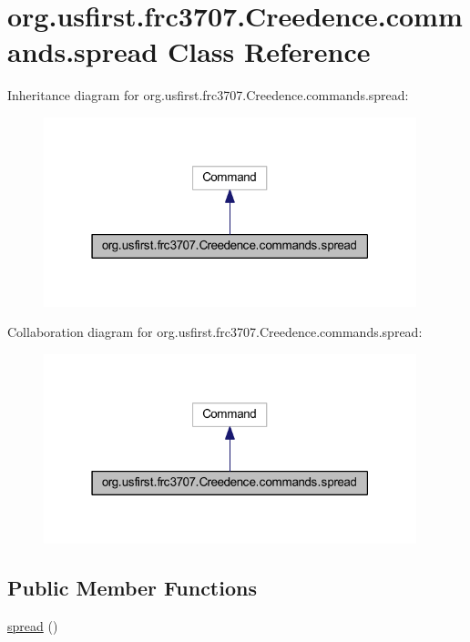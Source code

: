 \hypertarget{classorg_1_1usfirst_1_1frc3707_1_1_creedence_1_1commands_1_1spread}{}\section{org.\+usfirst.\+frc3707.\+Creedence.\+commands.\+spread Class Reference}
\label{classorg_1_1usfirst_1_1frc3707_1_1_creedence_1_1commands_1_1spread}


Inheritance diagram for org.\+usfirst.\+frc3707.\+Creedence.\+commands.\+spread\+:
\nopagebreak
\begin{figure}[H]
\begin{center}
\leavevmode
\includegraphics[width=307pt]{classorg_1_1usfirst_1_1frc3707_1_1_creedence_1_1commands_1_1spread__inherit__graph}
\end{center}
\end{figure}


Collaboration diagram for org.\+usfirst.\+frc3707.\+Creedence.\+commands.\+spread\+:
\nopagebreak
\begin{figure}[H]
\begin{center}
\leavevmode
\includegraphics[width=307pt]{classorg_1_1usfirst_1_1frc3707_1_1_creedence_1_1commands_1_1spread__coll__graph}
\end{center}
\end{figure}
\subsection*{Public Member Functions}
\begin{DoxyCompactItemize}
\item 
\mbox{\hyperlink{classorg_1_1usfirst_1_1frc3707_1_1_creedence_1_1commands_1_1spread_a610ece691c55fa15046ee92a80b212f0}{spread}} ()
\end{DoxyCompactItemize}
